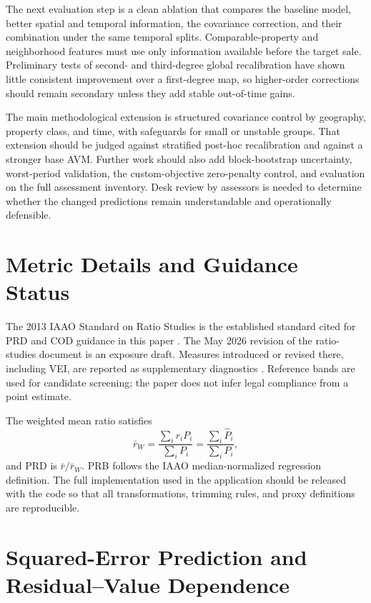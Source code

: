 \documentclass[10pt]{article}
\theoremstyle{definition}
\newcommand{\1}{\mathbf{1}}
\newcommand{\advisorchange}[1]{{\color{blue}#1}}
\begin{document}
{{\advisorchange{The next evaluation step is a clean ablation} that compares the baseline model, better spatial and temporal information, the covariance correction, and their combination under the same temporal splits. Comparable-property and neighborhood features must use only information available before the target sale. Preliminary tests of second- and third-degree global recalibration have shown little consistent improvement over a first-degree map, so higher-order corrections should remain secondary unless they add stable out-of-time gains.

The main methodological extension is structured covariance control by geography, property class, and time, with safeguards for small or unstable groups. That extension should be judged against stratified post-hoc recalibration and against a stronger base AVM. Further work should also add block-bootstrap uncertainty, worst-period validation, the custom-objective zero-penalty control, and evaluation on the full assessment inventory. Desk review by assessors is needed to determine whether the changed predictions remain understandable and operationally defensible.




\printbibliography


\appendix

\section{Metric Details and Guidance Status}
\label{app:metrics}

The 2013 IAAO Standard on Ratio Studies is the established standard cited for PRD and COD guidance in this paper \cite{IAAO2013Ratio}. The May 2026 revision of the ratio-studies document is an exposure draft. Measures introduced or revised there, including VEI, are reported as supplementary diagnostics \cite{IAAO2026ExposureRatio}. Reference bands are used for candidate screening; the paper does not infer legal compliance from a point estimate.

The weighted mean ratio satisfies
\[
\bar r_W
=
\frac{\sum_i r_iP_i}{\sum_iP_i}
=
\frac{\sum_i\widehat P_i}{\sum_iP_i},
\]
and PRD is $\bar r/\bar r_W$. PRB follows the IAAO median-normalized regression definition. The full implementation \advisorchange{used in the application should be released} with the code so that all transformations, trimming rules, and proxy definitions are reproducible.

\section{Squared-Error Prediction and Residual--Value Dependence}
\label{app:population_identity}

}}
\end{document}

